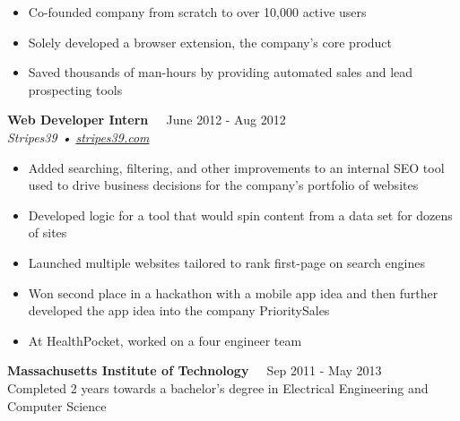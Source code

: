 \documentclass{resume}
\begin{document}
\nointerlineskip
\begin{itemize}
	\item Co-founded company from scratch to over 10,000 active users
	\item Solely developed a browser extension, the company's core product
	\item Saved thousands of man-hours by providing automated sales and lead prospecting tools
\end{itemize}

\textbf{Web Developer Intern}
\hfill{\textcolor{white}{•} June 2012 - Aug 2012}\\
\textit{Stripes39 • \href{https://www.stripes39.com}{stripes39.com}}

\nointerlineskip
\begin{itemize}
	\item Added searching, filtering, and other improvements to an internal SEO tool used to drive business decisions for the company's portfolio of websites
	\item Developed logic for a tool that would spin content from a data set for dozens of sites
	\item Launched multiple websites tailored to rank first-page on search engines
\end{itemize}

\bigskip

\colorbox{headerbg3}{\hspace{\linewidth}\hspace{-2\fboxsep}}

\begin{itemize}
	\item Won second place in a hackathon with a mobile app idea and then further developed the app idea into the company PrioritySales
	\item At HealthPocket, worked on a four engineer team
\end{itemize}


\bigskip

\colorbox{headerbg4}{\hspace{\linewidth}\hspace{-2\fboxsep}}

\textbf{Massachusetts Institute of Technology}
\hfill{\textcolor{white}{•} Sep 2011 - May 2013}\\
Completed 2 years towards a bachelor's degree in Electrical Engineering and Computer Science
\end{document}
